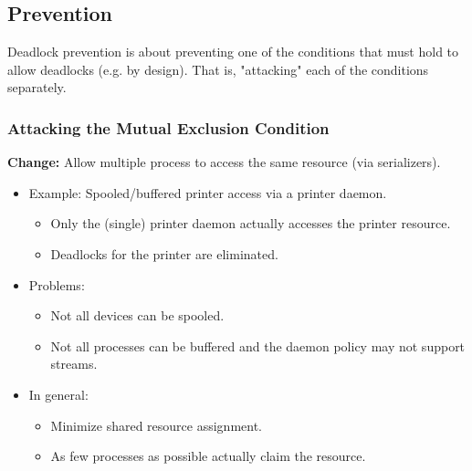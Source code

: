 		\subsection{Prevention}
			Deadlock prevention is about preventing one of the conditions that must hold to allow deadlocks (e.g. by design). That is, "attacking" each of the conditions separately.

			\subsubsection{Attacking the Mutual Exclusion Condition}
				\textbf{Change:} Allow multiple process to access the same resource (via serializers).
				\begin{itemize}
					\item Example: Spooled/buffered printer access via a printer daemon.
						\begin{itemize}
							\item Only the (single) printer daemon actually accesses the printer resource.
							\item Deadlocks for the printer are eliminated.
						\end{itemize}
					\item Problems:
						\begin{itemize}
							\item Not all devices can be spooled.
							\item Not all processes can be buffered and the daemon policy may not support streams.
						\end{itemize}
					\item In general:
						\begin{itemize}
							\item Minimize shared resource assignment.
							\item As few processes as possible actually claim the resource.
						\end{itemize}
				\end{itemize}

